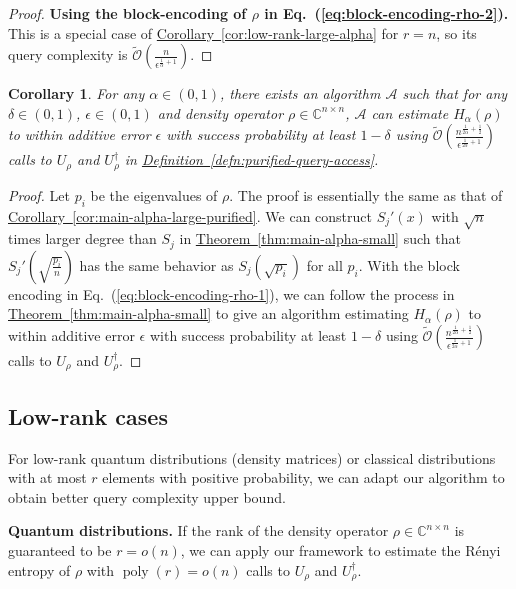 \documentclass[journal]{IEEEtran}
\newtheorem{corollary}{Corollary}
\newcommand{\eq}[1]{Eq.~(\ref{eq:#1})}
\newcommand{\thm}[1]{\hyperref[thm:#1]{Theorem~\ref*{thm:#1}}}
\newcommand{\cor}[1]{\hyperref[cor:#1]{Corollary~\ref*{cor:#1}}}
\newcommand{\defn}[1]{\hyperref[defn:#1]{Definition~\ref*{defn:#1}}}
\DeclareMathOperator{\poly}{poly}
\begin{document}
\begin{proof}
  \textbf{Using the block-encoding of $\rho$ in \eq{block-encoding-rho-2}.} This is a special case of \cor{low-rank-large-alpha} for $r = n$, so its query complexity is $\widetilde{\mathcal{O}}\left(\frac{n}{\epsilon^{\frac{1}{\alpha}+1}}\right)$.
\end{proof}

\begin{corollary}\label{cor:main-alpha-small-purified}
  For any $\alpha \in(0,1)$, there exists an algorithm $\mathcal{A}$ such that for any $\delta \in (0,1)$, $\epsilon\in(0,1)$ and density operator $\rho \in \mathbb{C}^{n\times n}$, $\mathcal{A}$ can estimate $H_{\alpha}(\rho)$ to within additive error $\epsilon$
  with success probability at least $1-\delta$ using $ \widetilde{\mathcal{O}}\left(\frac{n^{\frac{1}{2\alpha}+\frac{1}{2}}}{\epsilon^{\frac{1}{2\alpha}+1}}\right)$ calls to $U_{\rho}$ and $U_{\rho}^{\dagger}$ in \defn{purified-query-access}. 
\end{corollary}
\begin{proof}
    Let $p_i$ be the eigenvalues of $\rho$. The proof is essentially the same as that of \cor{main-alpha-large-purified}. We can construct $S_j'(x)$ with $\sqrt{n}$ times larger degree than $S_j$ in \thm{main-alpha-small} such that $S_j'(\sqrt{\frac{p_i}{n}})$ has the same behavior as $S_j(\sqrt{p_i})$ for all $p_i$. With the block encoding in \eq{block-encoding-rho-1}, we can follow the process in \thm{main-alpha-small} to give an algorithm estimating $H_{\alpha}(\rho)$ to within additive error $\epsilon$ with success probability at least $1-\delta$ using $ \widetilde{\mathcal{O}}\left(\frac{n^{\frac{1}{2\alpha}+\frac{1}{2}}}{\epsilon^{\frac{1}{2\alpha}+1}}\right)$ calls to $U_{\rho}$ and $U_{\rho}^{\dagger}$.

\end{proof}

\subsection{Low-rank cases}\label{sec:low-rank}
\noindent
For low-rank quantum distributions (density matrices) or classical distributions with at most $r$ elements with positive probability, we can adapt our algorithm to obtain better query complexity upper bound. 

\noindent
\textbf{Quantum distributions.}
If the rank of the density operator $\rho\in \mathbb{C}^{n\times n}$ is guaranteed to be $ r = o(n)$, we can apply our framework to estimate the R{\'e}nyi entropy of $\rho$ with $\poly(r) = o(n)$ calls to $U_{\rho}$ and $U_{\rho}^{\dagger}$. 
\end{document}
